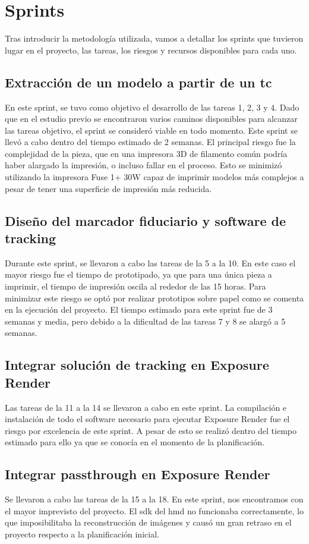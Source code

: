 \section{Sprints}
Tras introducir la metodología utilizada, vamos a detallar los sprints que tuvieron lugar en el proyecto, las tareas, los riesgos y recursos disponibles para cada uno.
\subsection{Extracción de un modelo a partir de un \acrshort{tc}}
En este sprint, se tuvo como objetivo el desarrollo de las tareas 1, 2, 3 y 4. Dado que en el estudio previo se encontraron varios caminos disponibles para alcanzar las tareas objetivo, el sprint se consideró viable en todo momento. Este sprint se llevó a cabo dentro del tiempo estimado de 2 semanas. El principal riesgo fue la complejidad de la pieza, que en una impresora 3D de filamento común podría haber alargado la impresión, o incluso fallar en el proceso. Esto se minimizó utilizando la impresora Fuse 1+ 30W capaz de imprimir modelos más complejos a pesar de tener una superficie de impresión más reducida.

\subsection{Diseño del marcador fiduciario y software de tracking}
Durante este sprint, se llevaron a cabo las tareas de la 5 a la 10. En este caso el mayor riesgo fue el tiempo de prototipado, ya que para una única pieza a imprimir, el tiempo de impresión oscila al rededor de las 15 horas. Para minimizar este riesgo se optó por realizar prototipos sobre papel como se comenta en la ejecución del proyecto. El tiempo estimado para este sprint fue de 3 semanas y media, pero debido a la dificultad de las tareas 7 y 8 se alargó a 5 semanas.

\subsection{Integrar solución de tracking en Exposure Render}
Las tareas de la 11 a la 14 se llevaron a cabo en este sprint. La compilación e instalación de todo el software necesario para ejecutar Exposure Render fue el riesgo por excelencia de este sprint. A pesar de esto se realizó dentro del tiempo estimado para ello ya que se conocía en el momento de la planificación.

\subsection{Integrar passthrough en Exposure Render}
Se llevaron a cabo las tareas de la 15 a la 18. En este sprint, nos encontramos con el mayor imprevisto del proyecto. El \acrshort{sdk} del \acrshort{hmd} no funcionaba correctamente, lo que imposibilitaba la reconstrucción de imágenes y causó un gran retraso en el proyecto respecto a la planificación inicial.

